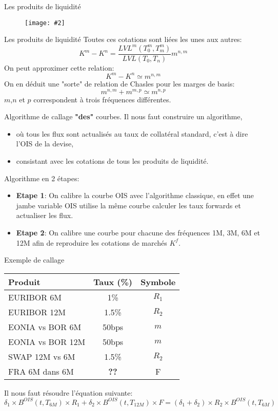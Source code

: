 \documentclass{beamer}
\newcommand{\FIG}[2]{\texttt{[image: \#2]}}
\begin{document}
\begin{frame}{Les produits de liquidité}
\begin{figure}[h]
\vspace{2mm}
\FIG{12cm}{figures/basis.png} 
\vspace{1mm}
\end{figure}
\end{frame}

\begin{frame}{Les produits de liquidité}
Toutes ces cotations sont liées les unes aux autres:\\
\[
K^m-K^n=\frac{LVL^m(T^m_0,T^m_m)}{LVL(T_0,T_n)} m^{n,m}
\]
On peut approximer cette relation:
\[
K^m-K^n \simeq m^{n,m}
\]
On en déduit une "sorte" de relation de Chasles pour les marges de basis:
\[
m^{n,m}+m^{m,p} \simeq m^{n,p}
\]
$m$,$n$ et $p$ correspondent à trois fréquences différentes.
\end{frame}

\begin{frame}{Algorithme de callage \textbf{"des"} courbes.}
Il nous faut construire un algorithme, 
\begin{itemize}
\item où tous les flux sont actualisés au taux de collatéral standard, c'est à dire l'OIS de la devise,
\item consistant avec les cotations de tous les produits de liquidité.
\end{itemize}
\vspace{0.5cm}
Algorithme en 2 étapes:
\begin{itemize}
\item \textbf{Etape 1}: On calibre la courbe OIS avec l'algorithme classique, en effet une jambe variable OIS utilise la même courbe calculer les taux forwards et actualiser les flux.
\item \textbf{Etape 2}: On calibre une courbe pour chacune des fréquences 1M, 3M, 6M et 12M afin de reproduire les cotations de marchés $K^f$.
\end{itemize}
\end{frame}

\begin{frame}{Exemple de callage}
\begin{center}
\begin{tabular}{|l|c|c|}
\hline
Produit & Taux (\%) & Symbole\\
\hline
EURIBOR 6M & 1\% & $R_1$ \\
EURIBOR 12M & 1.5\% & $R_2$ \\
EONIA vs BOR 6M & 50bps & $m$\\
EONIA vs BOR 12M & 50bps & $m$\\
SWAP 12M vs 6M & 1.5\% & $R_2$ \\
FRA 6M dans 6M & \textbf{??} & F \\
\hline
\end{tabular}
\end{center}
Il nous faut résoudre l'équation suivante:
\small
\[
\delta_1 \times B^{OIS}(t,T_{6M}) \times R_1 + \delta_2 \times B^{OIS}(t,T_{12M}) \times F = (\delta_1 + \delta_2) \times R_2 \times B^{OIS}(t,T_{6M})
\]
\end{frame}
\end{document}
